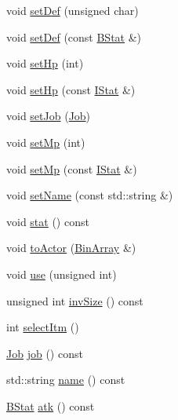 \begin{DoxyCompactItemize}
\item 
void \hyperlink{class_flow_1_1_actor_ac16d68ce3b4ae9c101e88c88c5a8fba7}{set\+Def} (unsigned char)
\item 
void \hyperlink{class_flow_1_1_actor_a7f26d278d238642dc41a078a1bf11e17}{set\+Def} (const \hyperlink{class_flow_1_1_b_stat}{B\+Stat} \&)
\item 
void \hyperlink{class_flow_1_1_actor_a9d238ca2827b58905429ffb52658b6e4}{set\+Hp} (int)
\item 
void \hyperlink{class_flow_1_1_actor_a7b3e24d878fc96ecab4745e61f58af01}{set\+Hp} (const \hyperlink{class_flow_1_1_i_stat}{I\+Stat} \&)
\item 
void \hyperlink{class_flow_1_1_actor_a3921cad19f9f35e813fd23ecf8c41d48}{set\+Job} (\hyperlink{namespace_flow_a05bb774db920847e46f3779aaef1b07b}{Job})
\item 
void \hyperlink{class_flow_1_1_actor_ab7eb041ec6ec3d5d7dc7461357b2f1f3}{set\+Mp} (int)
\item 
void \hyperlink{class_flow_1_1_actor_a903cd49c0be38c65c8def221f707e987}{set\+Mp} (const \hyperlink{class_flow_1_1_i_stat}{I\+Stat} \&)
\item 
void \hyperlink{class_flow_1_1_actor_aba0903cd8e1791709bda9fdf7cdf2b6b}{set\+Name} (const std\+::string \&)
\item 
void \hyperlink{class_flow_1_1_actor_a766104232c5b1e55c487d734af749cba}{stat} () const
\item 
void \hyperlink{class_flow_1_1_actor_ac49323dea55c9a516c9de9a7a29f3af1}{to\+Actor} (\hyperlink{class_flow_1_1_bin_array}{Bin\+Array} \&)
\item 
void \hyperlink{class_flow_1_1_actor_af13b4677ccd567310e86791b2a68be5d}{use} (unsigned int)
\item 
unsigned int \hyperlink{class_flow_1_1_actor_a21e03a4d2284091fe232dfe2cc7cbf47}{inv\+Size} () const
\item 
int \hyperlink{class_flow_1_1_actor_aa2e9fe8206357384b2b515fb4adc5613}{select\+Itm} ()
\item 
\hyperlink{namespace_flow_a05bb774db920847e46f3779aaef1b07b}{Job} \hyperlink{class_flow_1_1_actor_aac6046fc99b742a2307084b0b366c2ed}{job} () const
\item 
std\+::string \hyperlink{class_flow_1_1_actor_a66f88663ad38508b09e53115608dd0f7}{name} () const
\item 
\hyperlink{class_flow_1_1_b_stat}{B\+Stat} \hyperlink{class_flow_1_1_actor_ac78ab3e662afc0b9e2b49c5627fbee6f}{atk} () const
\item 

\end{DoxyCompactItemize}
